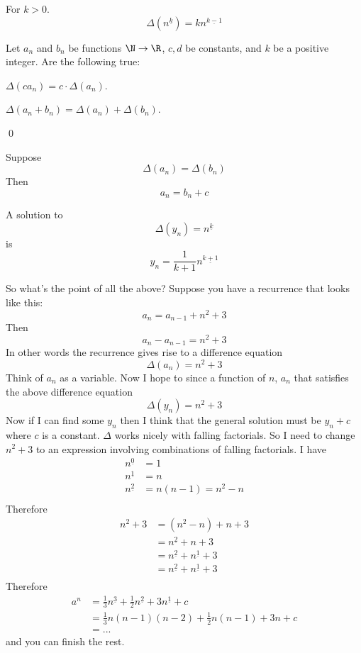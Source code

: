 \begin{thm} For $k > 0$. 
\[
\Delta ( n^{\underline{k}} ) = k n^{ \underline{k-1} }
\]
\end{thm}

\begin{ex} Let $a_n$ and $b_n$ be functions $\N \rightarrow \R$,
  $c,d$ be constants, and $k$ be a positive integer.
  Are the following true:
  \begin{tightlist}
    \item $\Delta (c a_n) = c \cdot \Delta (a_n)$.
    \item $\Delta (a_n + b_n) =  \Delta (a_n) + \Delta (b_n)$.
  \end{tightlist}
\qed
\end{ex}

\begin{ex}
  \begin{tightlist}
    
    \item Suppose 
    \[
    \Delta(a_n) = \Delta(b_n)
    \]
    Then
    \[
    a_n = b_n + c
    \]
    
    \item
    A solution to 
    \[
    \Delta (y_n) = n^{\underline{k}}
    \]
    is
    \[
    y_n = \frac{1}{k+1} n^{\underline{k+1}}
    \]
    
  \end{tightlist}
\end{ex}
  
So what's the point of all the above?
Suppose you have a recurrence that looks like this:
\[
a_n = a_{n-1} + n^2 + 3
\]
Then
\[
a_n - a_{n-1} = n^2 + 3
\]
In other words the recurrence gives rise to a difference equation
\[
\Delta (a_n) = n^2 + 3
\]
Think of $a_n$ as a variable.
Now I hope to since a function of $n$, $a_n$ that satisfies the
above difference equation
\[
\Delta (y_n) = n^2 + 3
\]
Now if I can find some $y_n$ then I think that the general solution
must be $y_n + c$ where $c$ is a constant.
$\Delta$ works nicely with falling factorials.
So I need to change $n^2 + 3$ to an expression involving
combinations of falling factorials.
I have
\begin{align*}
  n^{\underline{0}} &= 1 \\
  n^{\underline{1}} &= n \\
  n^{\underline{2}} &= n(n-1) = n^2 - n \\
\end{align*}
Therefore
\begin{align*}
  n^2 + 3
  &= (n^2 - n) + n + 3 \\
  &= n^{\underline{2}} + n + 3 \\
  &= n^{\underline{2}} + n^{\underline{1}} + 3 \\
  &= n^{\underline{2}} + n^{\underline{1}} + 3 \\
\end{align*}
Therefore
\begin{align*}
a^n
&= \frac{1}{3} n^{\underline{3}} + \frac{1}{2} n^{\underline{2}}
+ 3 n^{\underline{1}} + c \\
&= \frac{1}{3} n(n-1)(n-2) + \frac{1}{2} n(n-1)
+ 3 n + c \\
&= ...
\end{align*}
and you can finish the rest.

